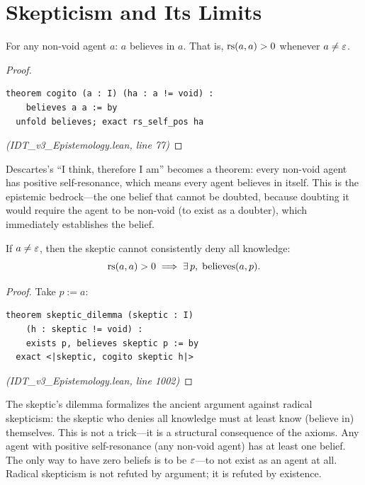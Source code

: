 \section{Skepticism and Its Limits}

\begin{theorem}[Cogito]
\label{thm:cogito}
For any non-void agent $a$: $a$ believes in $a$.
That is, $\mathrm{rs}(a, a) > 0$ whenever $a \neq \varepsilon$.
\end{theorem}

\begin{proof}
\begin{lstlisting}
theorem cogito (a : I) (ha : a != void) :
    believes a a := by
  unfold believes; exact rs_self_pos ha
\end{lstlisting}
\textit{(IDT\_v3\_Epistemology.lean, line 77)}
\end{proof}

\begin{interpretation}
Descartes's ``I think, therefore I am'' becomes a theorem: every non-void
agent has positive self-resonance, which means every agent believes in itself.
This is the epistemic bedrock---the one belief that cannot be doubted, because
doubting it would require the agent to be non-void (to exist as a doubter),
which immediately establishes the belief.
\end{interpretation}

\begin{theorem}
\label{thm:skeptic-dilemma}
If $a \neq \varepsilon$, then the skeptic cannot consistently deny all knowledge:
\[
  \mathrm{rs}(a, a) > 0 \implies \exists\, p,\; \mathrm{believes}(a, p).
\]
\end{theorem}

\begin{proof}
Take $p := a$:
\begin{lstlisting}
theorem skeptic_dilemma (skeptic : I)
    (h : skeptic != void) :
    exists p, believes skeptic p := by
  exact <|skeptic, cogito skeptic h|>
\end{lstlisting}
\textit{(IDT\_v3\_Epistemology.lean, line 1002)}
\end{proof}

\begin{interpretation}
The skeptic's dilemma formalizes the ancient argument against radical skepticism:
the skeptic who denies all knowledge must at least know (believe in) themselves.
This is not a trick---it is a structural consequence of the axioms. Any agent
with positive self-resonance (any non-void agent) has at least one belief. The
only way to have zero beliefs is to be $\varepsilon$---to not exist as an agent at all.
Radical skepticism is not refuted by argument; it is refuted by existence.
\end{interpretation}

